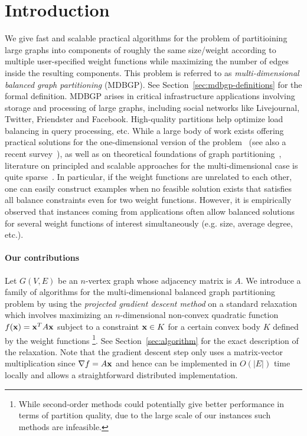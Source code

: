 \section{Introduction}\label{sec:intro}

We give fast and scalable practical algorithms for the problem of partitioining large graphs into components of roughly the same size/weight according to multiple user-specified weight functions while maximizing the number of edges inside the resulting components. This problem is referred to as \textit{multi-dimensional balanced graph partitioning} (MDBGP). See Section~\ref{sec:mdbgp-definitions} for the formal definition. MDBGP arises in critical infrastructure applications involving storage and processing of large graphs, including social networks like Livejournal, Twitter, Friendster and Facebook. High-quality partitions help optimize load balancing in query processing,  etc.  
While a large body of work exists offering practical solutions for the one-dimensional version of the problem~\cite{KK95, DGRW12, UB13, TGRV14, ABM16, DKKOPS16, MLLS17, KKPPSAP17} (see also a recent survey~\cite{BMSSS16}), as well as on theoretical foundations of graph partitioning~\cite{KNS09,AFKRS14,MM14}, literature on principled and scalable approaches for the multi-dimensional case is quite sparse~\cite{}. In particular, if the weight functions are unrelated to each other, one can easily construct examples when no feasible solution exists that satisfies all balance constraints even for two weight functions. However, it is empirically observed  that instances coming from applications often allow balanced solutions for several weight functions of interest simultaneously (e.g. size, average degree, etc.). 

\paragraph {Our contributions}
Let $G(V,E)$ be an $n$-vertex graph whose adjacency matrix is $A$. We introduce a family of algorithms for the multi-dimensional balanced graph partitioning problem by using the \textit{projected gradient descent method} on a standard relaxation which involves maximizing an $n$-dimensional non-convex quadratic function $f(\mathbf x) = \mathbf x^T A \mathbf x$ subject to a constraint $\mathbf x \in K$ for a certain convex body $K$ defined by the weight functions \footnote{While second-order methods could potentially give better performance in terms of partition quality, due to the large scale of our instances such methods are infeasible.}. See Section~\ref{sec:algorithm} for the exact description of the relaxation. Note that the gradient descent step only uses a matrix-vector multiplication since $\nabla f = A \mathbf x$ and hence can be implemented in $O(|E|)$ time locally and allows a straightforward distributed implementation.

